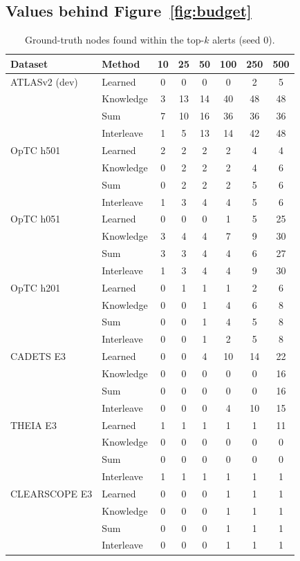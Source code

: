 \subsection{Values behind Figure~\ref{fig:budget}}
\begin{table}[!htbp]\centering\footnotesize\setlength{\tabcolsep}{3pt}
\caption{Ground-truth nodes found within the top-$k$ alerts (seed 0).}
\begin{tabular}{llcccccc}
\toprule
Dataset & Method & 10 & 25 & 50 & 100 & 250 & 500 \\
\midrule
ATLASv2 (dev) & Learned & 0 & 0 & 0 & 0 & 2 & 5 \\
 & Knowledge & 3 & 13 & 14 & 40 & 48 & 48 \\
 & Sum & 7 & 10 & 16 & 36 & 36 & 36 \\
 & Interleave & 1 & 5 & 13 & 14 & 42 & 48 \\
\midrule
OpTC h501 & Learned & 2 & 2 & 2 & 2 & 4 & 4 \\
 & Knowledge & 0 & 2 & 2 & 2 & 4 & 6 \\
 & Sum & 0 & 2 & 2 & 2 & 5 & 6 \\
 & Interleave & 1 & 3 & 4 & 4 & 5 & 6 \\
\midrule
OpTC h051 & Learned & 0 & 0 & 0 & 1 & 5 & 25 \\
 & Knowledge & 3 & 4 & 4 & 7 & 9 & 30 \\
 & Sum & 3 & 3 & 4 & 4 & 6 & 27 \\
 & Interleave & 1 & 3 & 4 & 4 & 9 & 30 \\
\midrule
OpTC h201 & Learned & 0 & 1 & 1 & 1 & 2 & 6 \\
 & Knowledge & 0 & 0 & 1 & 4 & 6 & 8 \\
 & Sum & 0 & 0 & 1 & 4 & 5 & 8 \\
 & Interleave & 0 & 0 & 1 & 2 & 5 & 8 \\
\midrule
CADETS E3 & Learned & 0 & 0 & 4 & 10 & 14 & 22 \\
 & Knowledge & 0 & 0 & 0 & 0 & 0 & 16 \\
 & Sum & 0 & 0 & 0 & 0 & 0 & 16 \\
 & Interleave & 0 & 0 & 0 & 4 & 10 & 15 \\
\midrule
THEIA E3 & Learned & 1 & 1 & 1 & 1 & 1 & 11 \\
 & Knowledge & 0 & 0 & 0 & 0 & 0 & 0 \\
 & Sum & 0 & 0 & 0 & 0 & 0 & 0 \\
 & Interleave & 1 & 1 & 1 & 1 & 1 & 1 \\
\midrule
CLEARSCOPE E3 & Learned & 0 & 0 & 0 & 1 & 1 & 1 \\
 & Knowledge & 0 & 0 & 0 & 1 & 1 & 1 \\
 & Sum & 0 & 0 & 0 & 1 & 1 & 1 \\
 & Interleave & 0 & 0 & 0 & 1 & 1 & 1 \\
\bottomrule
\end{tabular}
\end{table}
